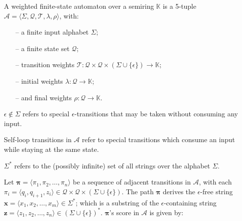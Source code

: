 \begin{definition}
  A weighted finite-state automaton over a semiring $\mathbb{K}$ is a 5-tuple $\mathcal{A} = \langle \Sigma, \mathcal{Q}, \mathcal{T}, \lambda, \rho \rangle$, with:

  \begin{itemize}
    \itemsep0em 
    \item[--] a finite input alphabet $\Sigma$;
    \item[--] a finite state set $\mathcal{Q}$;
    \item[--] transition weights $\mathcal{T}: \mathcal{Q} \times \mathcal{Q} \times (\Sigma \cup \{\epsilon\}) \rightarrow \mathbb{K}$;
    \item[--] initial weights $\lambda: \mathcal{Q} \rightarrow \mathbb{K}$; 
    \item[--] and final weights $\rho: \mathcal{Q} \rightarrow \mathbb{K}$.
  \end{itemize}

  \begin{remark}
    $\epsilon \notin \Sigma$ refers to special $\epsilon$-transitions that may be taken without consuming any input.
  \end{remark}

  \begin{remark}
    Self-loop transitions in $\mathcal{A}$ refer to special transitions which consume an input while staying at the same state.
  \end{remark}
  
  \begin{remark}
    $\Sigma^{*}$ refers to the (possibly infinite) set of all strings over the alphabet $\Sigma$.
  \end{remark}
   
\end{definition}

\begin{definition}

  Let $\pmb{\pi} = \langle \pi_1, \pi_2, \dots, \pi_n \rangle$ be a sequence of adjacent transitions in $\mathcal{A}$, with each $\pi_i = \langle q_i, q_{i+1}, z_i \rangle \in \mathcal{Q} \times \mathcal{Q} \times (\Sigma \cup \{\epsilon\})$. The path $\pmb{\pi}$ derives the $\epsilon$-free string $\pmb{x} = \langle x_1, x_2, \dots, x_m \rangle \in \Sigma^{*}$; which is a substring of the $\epsilon$-containing string $\pmb{z} = \langle z_1, z_2, \dots, z_n \rangle \in (\Sigma \cup \{\epsilon\})^{*}$. $\pmb{\pi}$'s score in $\mathcal{A}$ is given by:
  
\end{definition}


